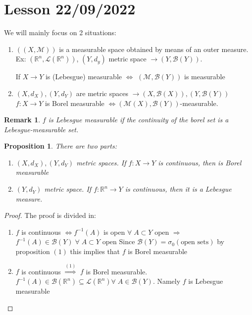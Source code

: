 \documentclass[a4paper,12pt]{article}
\theoremstyle{break}
\newtheorem{proposition}{Proposition}[section]
\newtheorem{remark}[section]{Remark}
\newcommand{\real}{\mathbb{R}}
\numberwithin{equation}{section}
\begin{document}
\section{Lesson 22/09/2022}
We will mainly focus on 2 situations:
\begin{enumerate}
    \item  \(((X, \mathcal{M}))\) is a measurable space obtained by means of an outer measure.
    Ex: \((\mathbb{R}^n, \mathcal{L}(\mathbb{R}^n))\), \((Y, d_y)\) metric space \(\to (Y, \mathcal{B}(Y))\). 

    If \(X \to Y\) is (Lebesgue) measurable \(\Longleftrightarrow\) \((\mathcal{M}, \mathcal{B}(Y))\) is measurable
    \item \((X, d_X), (Y, d_Y)\) are metric spaces \(\longrightarrow (X, \mathcal{B}(X)), (Y, \mathcal{B}(Y))\)
    \(f: X \to Y\) is Borel measurable \(\Longleftrightarrow (\mathcal{M}(X), \mathcal{B}(Y)) \)-measurable.
\end{enumerate}
\begin{remark}
     \(f\) is Lebesgue measurable if the continuity of the borel set is a Lebesgue-measurable set.
\end{remark}
\begin{proposition}
    There are two parts:
    \begin{enumerate}
        \item \((X, d_X), (Y, d_Y)\) metric spaces. If \(f:X \to Y\) is continuous, then is Borel measurable
        \item \((Y, d_Y)\) metric space. If \(f:\mathbb{R}^n \to Y\) is continuous, then it is a Lebesgue measure.
    \end{enumerate}
\end{proposition}
\begin{proof}
    The proof is divided in:
    \begin{enumerate}
        \item \(f\) is continuous \(\Longleftrightarrow f^{-1}(A)\) is open \(\forall \; A \subset Y\)
        open \(\Longrightarrow\) \(f^{-1}(A) \in \mathcal{B}(Y) \; \forall \; A \subset Y\) open
        Since \(\mathcal{B}(Y) = \sigma_0(\mbox{open sets})\) by proposition \((1)\) this implies that \(f\) is Borel measurable
        \item \(f\) is continuous \(\overset{(1)}{\Longrightarrow}\) \(f\) is Borel measurable.
        \(f^{-1}(A) \in \mathcal{B}(\real^n) \subseteq \mathcal{L}(\real^n) \forall \; A \in \mathcal{B}(Y)\). Namely \(f\) is Lebesgue measurable
    \end{enumerate}
\end{proof}
\end{document}
